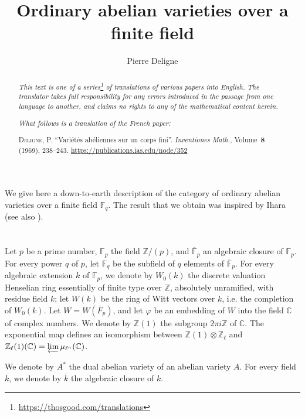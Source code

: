 \documentclass{article}
\title{Ordinary abelian varieties over a finite field}
\author{Pierre Deligne}
\date{}
\newcommand{\doctype}{French paper}
\newcommand{\origcit}{%
  \textsc{Deligne, P.}
  ``Vari\'{e}t\'{e}s ab\'{e}liennes sur un corps fini''.
  \emph{Inventiones Math.}, Volume~\textbf{8} (1969), 238--243.
  {\url{https://publications.ias.edu/node/352}}%
}
\newcommand{\FF}{\mathbb{F}}
\newcommand{\ZZ}{\mathbb{Z}}
\newcommand{\CC}{\mathbb{C}}
\newcommand{\oldpage}[1]{\marginpar{\footnotesize$\Big\vert$ \textit{p.~#1}}}
\begin{document}
\maketitle
\thispagestyle{fancy}

\renewcommand{\abstractname}{Translator's note.}

\begin{abstract}
  \renewcommand*{\thefootnote}{\fnsymbol{footnote}}
  \emph{This text is one of a series\footnote{\url{https://thosgood.com/translations}} of translations of various papers into English.}
  \emph{The translator takes full responsibility for any errors introduced in the passage from one language to another, and claims no rights to any of the mathematical content herein.}
  
  \emph{What follows is a translation of the \doctype:}

  \medskip\noindent
  \origcit
\end{abstract}

\setcounter{footnote}{0}



\oldpage{238}
We give here a down-to-earth description of the category of ordinary abelian varieties over a finite field $\FF_q$.
The result that we obtain was inspired by Ihara~\cite[ch.~V]{2} (see also \cite{3}).


\section{}
\label{1}
Let $p$ be a prime number, $\FF_p$ the field $\ZZ/(p)$, and $\overline{\FF}_p$ an algebraic closure of $\FF_p$.
For every power $q$ of $p$, let $\FF_q$ be the subfield of $q$ elements of $\overline{\FF}_p$.
For every algebraic extension $k$ of $\FF_p$, we denote by $W_0(k)$ the discrete valuation Henselian ring essentially of finite type over $\ZZ$, absolutely unramified, with residue field $k$;
let $W(k)$ be the ring of Witt vectors over $k$, i.e. the completion of $W_0(k)$.
Let $W=W(\overline{F}_p)$, and let $\varphi$ be an embedding of $W$ into the field $\CC$ of complex numbers.
We denote by $\ZZ(1)$ the subgroup $2\pi i\ZZ$ of $\CC$.
The exponential map defines an isomorphism between $\ZZ(1)\otimes\ZZ_\ell$ and $\ZZ_\ell(1)(\CC)=\varprojlim\mu_{\ell^n}(\CC)$.

We denote by $A^*$ the dual abelian variety of an abelian variety $A$.
For every field $k$, we denote by $\overline{k}$ the algebraic closure of $k$.
\end{document}
